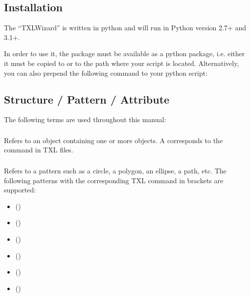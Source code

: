 \documentclass[letterpaper,10pt,english]{sphinxmanual}
\begin{document}
\subsection{Installation}
\label{Chapters/10_Introduction:installation}
The ``TXLWizard'' is written in python and will run in Python version 2.7+ and 3.1+.

In order to use it, the  package must be available as
a python package, i.e. either it must be copied to
or to the path where your script is located.
Alternatively, you can also prepend the following command to your python script:


\subsection{Structure / Pattern / Attribute}
\label{Chapters/10_Introduction:structure-pattern-attribute}
The following terms are used throughout this manual:


\subsubsection{}
\label{Chapters/10_Introduction:structure}
Refers to an object containing one or more  objects.
A  corresponds to the  command in TXL files.


\subsubsection{}
\label{Chapters/10_Introduction:pattern}
Refers to a pattern such as a circle, a polygon, an ellipse, a path, etc.
The following patterns with the corresponding TXL command in brackets are supported:
\begin{itemize}
\item {} 
 ()

\item {} 
 ()

\item {} 
 ()

\item {} 
 ()

\item {} 
 ()

\item {} 
 ()

\end{itemize}
\end{document}
